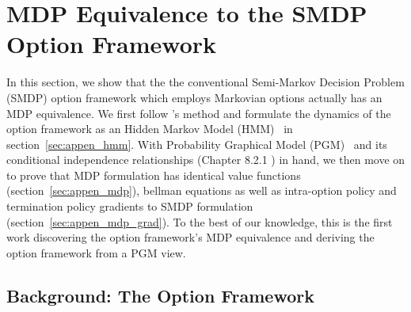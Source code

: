 \section{MDP Equivalence to the SMDP Option Framework}
\label{sec:appen_oc_pgm}

In this section, we show that the the conventional Semi-Markov
Decision Problem (SMDP) option framework which employs Markovian
options actually has an MDP equivalence. We first follow
's method and formulate the dynamics
of the option framework as an Hidden Markov Model
(HMM)~\cite{bishop2006pattern} in section~\ref{sec:appen_hmm}.
With Probability Graphical Model (PGM)~\cite{bishop2006pattern}
and its conditional independence relationships (Chapter 8.2.1
\cite{bishop2006pattern}) in hand, we then move on to prove that
MDP formulation has identical value functions
(section~\ref{sec:appen_mdp}), bellman equations as well as
intra-option policy and termination policy gradients to SMDP
formulation (section~\ref{sec:appen_mdp_grad}). To the best of
our knowledge, this is the first work discovering the option
framework's MDP equivalence and deriving the option framework
from a PGM view.

\subsection{Background: The Option Framework}
\label{sec:appen_oc_background}

